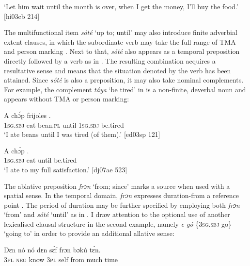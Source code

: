 \glt ‘Let him wait until the month is over, when I get the money, I’ll buy the food.’ [hi03cb 214]
\z

The multifunctional item \textit{sóté} ‘up to; until’ may also introduce finite adverbial extent clauses, in which the subordinate verb may take the full range of TMA and person marking . Next to that, \textit{sóté} also appears as a temporal preposition directly followed by a verb as in . The resulting combination acquires a resultative sense and means that the situation denoted by the verb has been attained. Since \textit{sóté} is also a preposition, it may also take nominal complements. For example, the complement \textit{táya} ‘be tired’ in  is a non-finite, deverbal noun and appears without TMA or person marking: 


\ea%
    \label{ex:key:1028}
    \gll A    chɔ́p  frijoles          .\\
\textsc{1sg.sbj}  eat    bean.\textsc{pl}  until  \textsc{1sg.sbj}  be.tired\\

\glt ‘I ate beans until I was tired (of them).’ [ed03sp 121]
\z


\ea%
    \label{ex:key:1029}
    \gll A    chɔ́p      .\\
\textsc{1sg.sbj}  eat    until  be.tired\\

\glt ‘I ate to my full satisfaction.’ [dj07ae 523]
\z

The ablative preposition \textit{frɔn} ‘from; since’ marks a source\index{} when used with a spatial sense. In the temporal domain, \textit{frɔn} expresses duration-from a reference point . The period of duration may be further specified by employing both \textit{frɔn} ‘from’ and \textit{sóté} ‘until’ as in . I draw attention to the optional use of another lexicalised clausal structure in the second example, namely\textit{ e gó} \{3\textsc{sg.sbj} go\textsc{\}} ‘going to’ in order to provide an additional allative sense:


\ea%
    \label{ex:key:1030}
    \gll Dɛn  nó  nó    dɛn  sɛ́f  frɔn    bɔkú  tɛ́n.\\
\textsc{3pl}  \textsc{neg}  know  \textsc{3pl}  self  from  much  time\\

